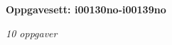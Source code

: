 \centerline{\bf Oppgavesett: i00130no-i00139no}
\vskip 10pt
\centerline{\it 10 oppgaver}\vskip 10pt
\vskip 10pt
